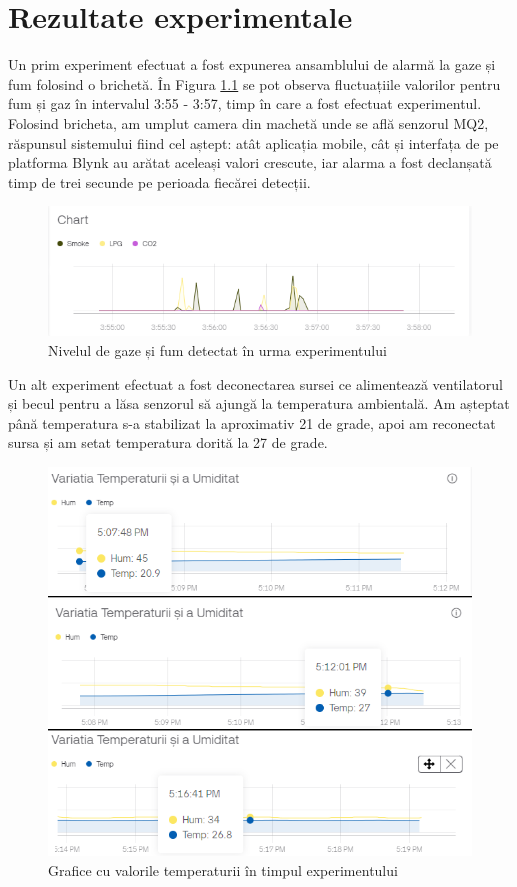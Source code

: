 \chapter{Rezultate experimentale}
\thispagestyle{pagestyle}

Un prim experiment efectuat a fost expunerea ansamblului de alarmă la gaze și fum folosind o brichetă. În Figura \ref{fig:chart_gaze} se pot observa fluctuațiile valorilor pentru fum și gaz în intervalul 3:55 - 3:57, timp în care a fost efectuat experimentul. Folosind bricheta, am umplut camera din machetă unde se află senzorul MQ2, răspunsul sistemului fiind cel aștept: atât aplicația mobile, cât și interfața de pe platforma Blynk au arătat aceleași valori crescute, iar alarma a fost declanșată timp de trei secunde pe perioada fiecărei detecții.

\begin{figure}[H]
\includegraphics[width=0.8\linewidth]{bachelors_ro/images/chart_gaze.png}
\caption{Nivelul de gaze și fum detectat în urma experimentului}
\label{fig:chart_gaze}
\end{figure}

Un alt experiment efectuat a fost deconectarea sursei ce alimentează ventilatorul și becul pentru a lăsa senzorul să ajungă la temperatura ambientală. Am așteptat până temperatura s-a stabilizat la aproximativ 21 de grade, apoi am reconectat sursa și am setat temperatura dorită la 27 de grade.

\begin{figure}[H]
\includegraphics[width=0.5\linewidth]{bachelors_ro/images/combined_chart.png}
\caption{Grafice cu valorile temperaturii în timpul experimentului}
\label{fig:combined_chart}
\end{figure}

